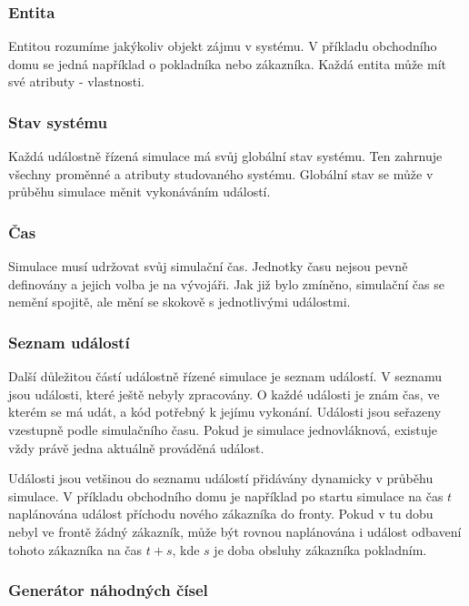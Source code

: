 \subsubsection{Entita}

Entitou rozumíme jakýkoliv objekt zájmu v systému. V příkladu obchodního domu se jedná například o pokladníka nebo zákazníka. Každá entita může mít své atributy - vlastnosti.

\subsubsection{Stav systému}

Každá událostně řízená simulace má svůj globální stav systému. Ten zahrnuje všechny proměnné a atributy studovaného systému. Globální stav se může v průběhu
simulace měnit vykonáváním událostí.

\subsubsection{Čas}

Simulace musí udržovat svůj simulační čas. Jednotky času nejsou pevně definovány a jejich volba je na vývojáři. Jak již bylo zmíněno, simulační čas se nemění spojitě, ale mění se skokově s jednotlivými událostmi.

\subsubsection{Seznam událostí}

Další důležitou částí událostně řízené simulace je seznam událostí. V seznamu jsou události, které ještě nebyly zpracovány. O každé události je znám čas, ve kterém se má udát, a kód potřebný k jejímu vykonání. Události jsou seřazeny vzestupně podle simulačního času. Pokud je simulace jednovláknová, existuje vždy právě jedna aktuálně prováděná událost.

Události jsou vetšinou do seznamu událostí přidávány dynamicky v průběhu simulace. V příkladu obchodního domu je například po startu simulace na čas $t$ naplánována událost příchodu nového zákazníka do fronty. Pokud v tu dobu nebyl ve frontě žádný zákazník, může být rovnou naplánována i událost odbavení tohoto zákazníka na čas $t+s$, kde $s$ je doba obsluhy zákazníka pokladním.

\subsubsection{Generátor náhodných čísel}

